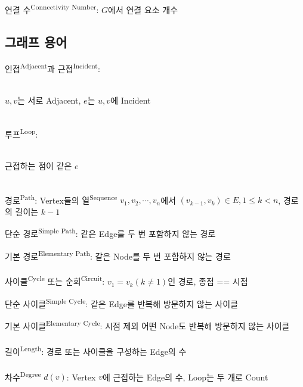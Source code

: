 연결 수\textsuperscript{Connectivity Number}: $G$에서 연결 요소 개수
\newpage
\subsection{그래프 용어}
인접\textsuperscript{Adjacent}과 근접\textsuperscript{Incident}:\\
\begin{center}
    \\
    $u, v$는 서로 Adjacent, $e$는 $u, v$에 Incident
\end{center}\phantom{}
\\
루프\textsuperscript{Loop}:\\
\begin{center}
    \\
    근접하는 점이 같은 $e$
\end{center}\phantom{}
\\
경로\textsuperscript{Path}: Vertex들의 열\textsuperscript{Sequence} $v_1, v_2, \cdots, v_n$에서 $(v_{k-1}, v_k) \in E, 1 \leq k < n$, 경로의 길이는 $k - 1$

단순 경로\textsuperscript{Simple Path}: 같은 Edge를 두 번 포함하지 않는 경로

기본 경로\textsuperscript{Elementary Path}: 같은 Node를 두 번 포함하지 않는 경로
\\\\
사이클\textsuperscript{Cycle} 또는 순회\textsuperscript{Circuit}: $v_1=v_k(k \neq 1)$인 경로, 종점 == 시점

단순 사이클\textsuperscript{Simple Cycle}: 같은 Edge를 반복해 방문하지 않는 사이클

기본 사이클\textsuperscript{Elementary Cycle}: 시점 제외 어떤 Node도 반복해 방문하지 않는 사이클
\\\\
길이\textsuperscript{Length}: 경로 또는 사이클을 구성하는 Edge의 수
\\\\
차수\textsuperscript{Degree} $d(v)$: Vertex $v$에 근접하는 Edge의 수, Loop는 두 개로 Count

